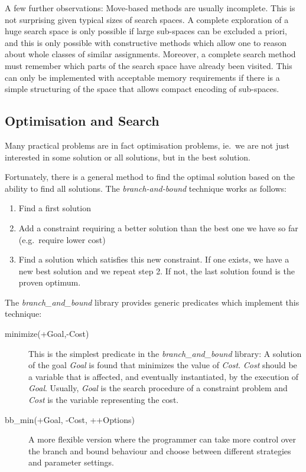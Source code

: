 A few further observations:
Move-based methods are usually incomplete. This is not surprising given
typical sizes of search spaces.
A complete exploration of a huge search space
is only possible if large sub-spaces can be excluded a priori, and this
is only possible with constructive methods which allow one to reason about
whole classes of similar assignments.
Moreover, a complete search method must remember which parts of the
search space have already been visited.
This can only be implemented with
acceptable memory requirements if there is a simple structuring of the
space that allows compact encoding of sub-spaces.


\subsection{Optimisation and Search}
\label{secbboptsearch}
Many practical problems are in fact optimisation problems, ie.\ we are
not just interested in some solution or all solutions, but in
the best solution.

Fortunately, there is a general method to find the optimal solution
based on the ability to find all solutions.
The {\em branch-and-bound} technique works as follows:
\begin{enumerate}
\item Find a first solution
\item Add a constraint requiring a better solution than the best
    one we have so far (e.g.\ require lower cost)
\item Find a solution which satisfies this new constraint.
    If one exists, we have a new best solution and we repeat step 2.
    If not, the last solution found is the proven optimum.
\end{enumerate}
The {\em branch\_and\_bound} library provides generic predicates 
which implement this technique:
\begin{description}
\item[minimize(+Goal,-Cost)]
This is the simplest predicate in the {\em branch_and_bound} library:
A solution of the goal {\it Goal} is found that minimizes the value of
{\em Cost}. {\em Cost} should be a variable that is affected, and 
eventually instantiated, by the execution of {\it Goal}. Usually, {\it Goal}
is the search procedure of a constraint problem and {\it Cost} is the variable
representing the cost.

\item[bb_min(+Goal, -Cost, ++Options)]
A more flexible version where the programmer can take more control
over the branch and bound behaviour and choose between different
strategies and parameter settings.
\end{description}


